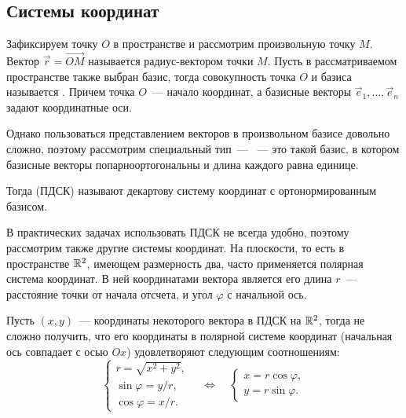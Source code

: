 \subsection{Системы координат}
	
	Зафиксируем точку $O$ в пространстве и рассмотрим произвольную точку $M$. Вектор $\vec{r} = \overrightarrow{OM}$ называется радиус-вектором точки $M$. Пусть в рассматриваемом пространстве также выбран базис, тогда совокупность точка $O$ и базиса называется . Причем точка $O$~--- начало координат, а базисные векторы $\vec{e}_1, \ldots, \vec{e}_n$ задают координатные оси.
	
	Однако пользоваться представлением векторов в произвольном базисе довольно сложно, поэтому рассмотрим специальный тип~--- ~--- это такой базис, в котором базисные векторы попарноортогональны и длина каждого равна единице.
	
	Тогда  (ПДСК) называют декартову систему координат с ортонормированным базисом.
	
	В практических задачах использовать ПДСК не всегда удобно, поэтому рассмотрим также другие системы координат. На плоскости, то есть в пространстве $\mathbb{R}^2$, имеющем размерность два, часто применяется полярная система координат. В ней координатами вектора является его длина $r$~--- расстояние точки от начала отсчета, и угол $\varphi$ с начальной ось. 
	
	Пусть $(x,y)$~--- координаты некоторого вектора в ПДСК на $\mathbb{R}^2$, тогда не сложно получить, что его координаты в полярной системе координат (начальная ось совпадает с осью $Ox$)  удовлетворяют следующим соотношениям:
	\begin{equation}
		\begin{cases}
			r = \sqrt{x^2 + y^2},\\
			\sin \varphi = y/r,\\
			\cos \varphi = x/r.
		\end{cases}
		\quad \Leftrightarrow \quad 
		\begin{cases}
			x = r \cos \varphi,\\
			y = r \sin \varphi.
		\end{cases}
	\end{equation}
	
